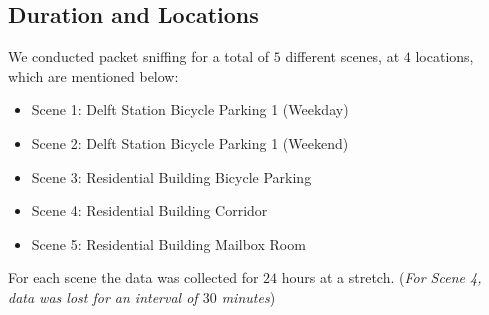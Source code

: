  \subsection{Duration and Locations}
 We conducted packet sniffing for a total of $5$ different scenes, at $4$ locations, which are mentioned below:
 \begin{itemize}
     \item Scene 1: Delft Station Bicycle Parking 1 (Weekday)
     \item Scene 2: Delft Station Bicycle Parking 1 (Weekend)
     \item Scene 3: Residential Building Bicycle Parking
     \item Scene 4: Residential Building Corridor
     \item Scene 5: Residential Building Mailbox Room
 \end{itemize}
 
 For each scene the data was collected for $24$ hours at a stretch. (\textit{For Scene 4, data was lost for an interval of $30$ minutes})